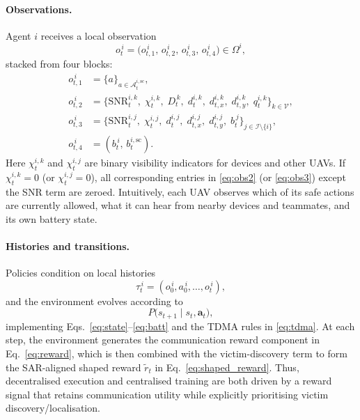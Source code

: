 \documentclass[drones,article,accept,pdftex,moreauthors]{Definitions/mdpi}
\begin{document}
\paragraph{Observations.}
Agent $i$ receives a local observation
\begin{equation}
o_t^{\,i}=\big(o_{t,1}^{\,i},\,o_{t,2}^{\,i},\,o_{t,3}^{\,i},\,o_{t,4}^{\,i}\big)\in\Omega^i,
\label{eq:obs_vec}
\end{equation}
stacked from four blocks:
\begin{subequations}\label{eq:obs_blocks}
\begin{align}
o_{t,1}^{\,i}&=\{a\}_{a\in\mathcal{A}^{i,\mathrm{sc}}_t}, \label{eq:obs1}\\
o_{t,2}^{\,i}&=\big\{\mathrm{SNR}_{t}^{i,k},\; \chi_{t}^{i,k},\; D_t^{\,k},\; d_{t}^{i,k},\; d_{t,x}^{i,k},\; d_{t,y}^{i,k},\; q_{t}^{i,k}\big\}_{k\in\mathcal{V}}, \label{eq:obs2}\\
o_{t,3}^{\,i}&=\big\{\mathrm{SNR}_{t}^{i,j},\; \chi_{t}^{i,j},\; d_{t}^{i,j},\; d_{t,x}^{i,j},\; d_{t,y}^{i,j},\; b_t^{\,j}\big\}_{j\in\mathcal{I}\setminus\{i\}}, \label{eq:obs3}\\
o_{t,4}^{\,i}&=(b_t^{\,i},\, b_{t}^{i,\mathrm{sc}}). \label{eq:obs4}
\end{align}
\end{subequations}
Here $\chi_{t}^{i,k}$ and $\chi_{t}^{i,j}$ are binary visibility indicators for devices and
other UAVs. If $\chi_{t}^{i,k}=0$ (or $\chi_{t}^{i,j}=0$), all corresponding entries in
\eqref{eq:obs2} (or \eqref{eq:obs3}) except the SNR term are zeroed. Intuitively, each
UAV observes which of its safe actions are currently allowed, what it can hear from
nearby devices and teammates, and its own battery state.

\paragraph{Histories and transitions.}
Policies condition on local histories
\begin{equation}
\tau_t^{\,i}=(o_0^{\,i},a_0^{\,i},\dots,o_t^{\,i}),
\label{eq:history}
\end{equation}
and the environment evolves according to
\begin{equation}
P\big(s_{t+1}\mid s_t,\mathbf{a}_t\big),
\label{eq:transition_kernel}
\end{equation}
implementing Eqs.~\eqref{eq:state}--\eqref{eq:batt} and the TDMA rules in
\eqref{eq:tdma}. At each step, the environment generates the communication reward
component in Eq.~\eqref{eq:reward}, which is then combined with the victim-discovery
term to form the SAR-aligned shaped reward
\(\tilde r_t\) in Eq.~\eqref{eq:shaped_reward}. Thus, decentralised execution
and centralised training are both driven by a reward signal that retains
communication utility while explicitly prioritising victim discovery/localisation.
\end{document}
